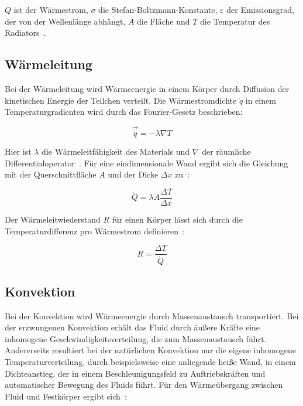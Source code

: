 $\dot{Q}$ ist der Wärmestrom, $\sigma$ die Stefan-Boltzmann-Konstante, $\varepsilon$ der Emissionsgrad, der von der Wellenlänge
abhängt, $A$ die Fläche und $T$ die Temperatur des Radiators~\cite{Wolfersdorf-2014}.

\subsection{Wärmeleitung}\label{sec:waermeleitung}

Bei der Wärmeleitung wird Wärmeenergie in einem Körper durch Diffusion der kinetischen Energie der Teilchen verteilt.
Die Wärmestromdichte $\dot{q}$ in einem Temperaturgradienten wird durch das Fourier-Gesetz beschrieben:

\begin{equation}
  \label{eq:fourier}
  \vec{\dot{q}} = -\lambda \nabla T
\end{equation}

Hier ist $\lambda$ die Wärmeleitfähigkeit des Materials und $\nabla$ der räumliche Differentialoperator~\cite{Weigand-2022}.
Für eine eindimensionale Wand ergibt sich die Gleichung mit der Querschnittfläche $A$ und der Dicke $\Delta x$ zu~\cite{Weigand-2022}:

\begin{equation}
  \label{eq:fourier_1d}
  \dot{Q} = \lambda A \frac{\Delta T}{\Delta x}
\end{equation}

Der Wärmeleitwiederstand $R$ für einen Körper lässt sich durch die Temperaturdifferenz pro Wärmestrom definieren~\cite{Weigand-2022}:

\begin{equation}
  \label{eq:waermewiederstand}
  R = \frac{\Delta T}{\dot{Q}}
\end{equation}

\subsection{Konvektion}\label{sec:konvektion}

Bei der Konvektion wird Wärmeenergie durch Massenaustausch transportiert. Bei der erzwungenen Konvektion erhält das Fluid durch äußere Kräfte
eine inhomogene Geschwindigkeitsverteilung, die zum Massenaustausch führt. Andererseits resultiert bei der natürlichen Konvektion nur die eigene
inhomogene Temperaturverteilung, durch beispielsweise eine anliegende heiße Wand, in einem
Dichteanstieg, der in einem Beschleunigungsfeld zu Auftriebskräften und automatischer Bewegung des Fluids führt.
Für den Wärmeübergang zwischen Fluid und Festkörper ergibt sich~\cite{Weigand-2022}:

